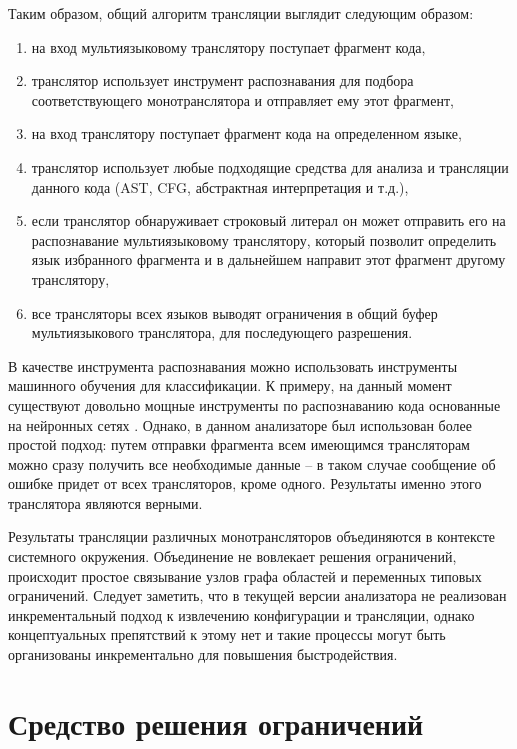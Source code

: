 Таким образом, общий алгоритм трансляции выглядит следующим образом:
\begin{enumerate}[1)]
    \item на вход мультиязыковому транслятору поступает фрагмент кода,
    \item транслятор использует инструмент распознавания для подбора соответствующего монотранслятора и отправляет ему этот фрагмент,
    \item на вход транслятору поступает фрагмент кода на определенном языке,
    \item транслятор использует любые подходящие средства для анализа и трансляции данного кода
    (AST, CFG, абстрактная интерпретация и т.д.),
    \item если транслятор обнаруживает строковый литерал он может отправить его на распознавание мультиязыковому транслятору, который
    позволит определить язык избранного фрагмента и в дальнейшем направит этот фрагмент другому транслятору,
    \item все трансляторы всех языков выводят ограничения в общий буфер мультиязыкового транслятора, для последующего разрешения.
\end{enumerate}

В качестве инструмента распознавания можно использовать инструменты машинного обучения для классификации. К примеру,
на данный момент существуют довольно мощные инструменты по распознаванию кода основанные на нейронных сетях \cite{guesslang}.
Однако, в данном анализаторе был использован более простой подход: путем отправки фрагмента всем имеющимся
трансляторам можно сразу получить все необходимые данные -- в таком случае сообщение об ошибке придет от всех трансляторов, кроме одного.
Результаты именно этого транслятора являются верными.

Результаты трансляции различных монотрансляторов объединяются в контексте системного окружения. Объединение не
вовлекает решения ограничений, происходит простое связывание узлов графа областей и переменных типовых ограничений.
Следует заметить, что в текущей версии
анализатора не реализован инкрементальный подход к извлечению конфигурации и трансляции, однако концептуальных
препятствий к этому нет и такие процессы могут быть организованы инкрементально для повышения быстродействия.

\section{Средство решения ограничений} \label{sec:solver}

